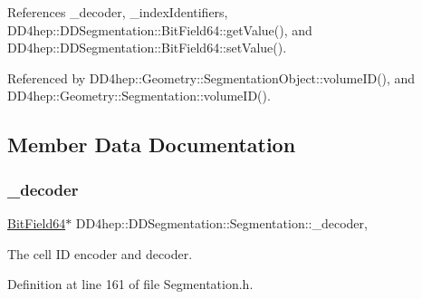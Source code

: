 References \+\_\+decoder, \+\_\+index\+Identifiers, D\+D4hep\+::\+D\+D\+Segmentation\+::\+Bit\+Field64\+::get\+Value(), and D\+D4hep\+::\+D\+D\+Segmentation\+::\+Bit\+Field64\+::set\+Value().



Referenced by D\+D4hep\+::\+Geometry\+::\+Segmentation\+Object\+::volume\+I\+D(), and D\+D4hep\+::\+Geometry\+::\+Segmentation\+::volume\+I\+D().



\subsection{Member Data Documentation}
\hypertarget{class_d_d4hep_1_1_d_d_segmentation_1_1_segmentation_a48d782572ff008ea0f05c869526735f4}{}\label{class_d_d4hep_1_1_d_d_segmentation_1_1_segmentation_a48d782572ff008ea0f05c869526735f4} 
\subsubsection{\texorpdfstring{\+\_\+decoder}{\_decoder}}
{\footnotesize\ttfamily \hyperlink{class_d_d4hep_1_1_d_d_segmentation_1_1_bit_field64}{Bit\+Field64}$\ast$ D\+D4hep\+::\+D\+D\+Segmentation\+::\+Segmentation\+::\+\_\+decoder\hspace{0.3cm}{\ttfamily [mutable]}, {\ttfamily [protected]}}



The cell ID encoder and decoder. 



Definition at line 161 of file Segmentation.\+h.



